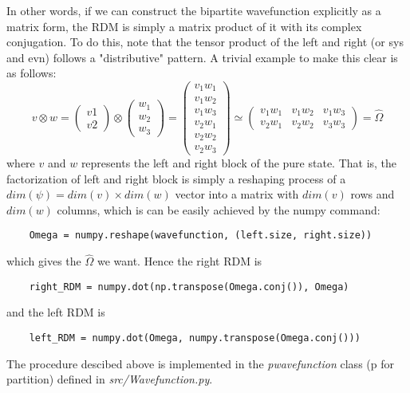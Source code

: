 \documentclass[a4paper]{article}
\theoremstyle{definition}
\numberwithin{thm}{section}
\numberwithin{equation}{section}
\begin{document}
In other words, if we can construct the bipartite wavefunction explicitly as a matrix form, the RDM is simply a matrix product of it with its complex conjugation. To do this, note that the tensor product of the left and right (or sys and evn) follows a "distributive" pattern. A trivial example to make this clear is as follows:
\begin{equation}
	v \otimes w = 
	\begin{pmatrix}
		v1 \\ v2
	\end{pmatrix}
	\otimes
	\begin{pmatrix}
		w_1 \\ w_2 \\ w_3
	\end{pmatrix}
	=
	\begin{pmatrix}
		v_1 w_1 \\ v_1 w_2 \\ v_1 w_3 \\ v_2 w_1 \\ v_2 w_2 \\ v_2 w_3
	\end{pmatrix}
	\simeq
	\begin{pmatrix}
		v_1 w_1 & v_1 w_2 & v_1 w_3 \\
		v_2 w_1 & v_2 w_2 & v_3 w_3
	\end{pmatrix}
	= \hat{\Omega}
\end{equation}
where $v$ and $w$  represents the left and right block of the pure state. That is, the factorization of left and right block is simply a reshaping process of a $dim(\psi) = dim(v)\times dim(w)$ vector into a matrix with $dim(v)$ rows and  $dim(w)$ columns, which is can be easily achieved by the numpy command:
\begin{verbatim}
	Omega = numpy.reshape(wavefunction, (left.size, right.size))
\end{verbatim}
which gives the $\hat{\Omega}$ we want. Hence the right RDM is
\begin{verbatim}
	right_RDM = numpy.dot(np.transpose(Omega.conj()), Omega)
\end{verbatim}
and the left RDM is
\begin{verbatim}
	left_RDM = numpy.dot(Omega, numpy.transpose(Omega.conj()))
\end{verbatim}
The procedure descibed above is implemented in the \textit{pwavefunction} class (p for partition) defined in \textit{src/Wavefunction.py}. 

























%
\end{document}
